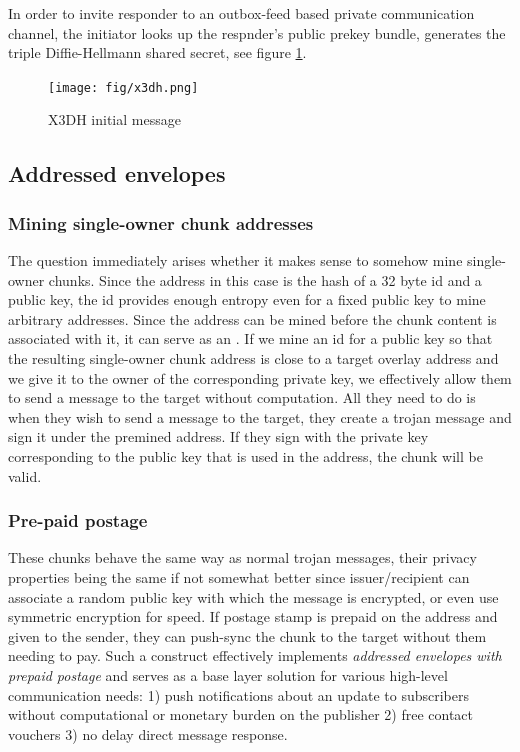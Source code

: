 In order to invite responder to an outbox-feed based private communication channel, the initiator looks up the respnder's public prekey bundle,  generates the triple Diffie-Hellmann shared secret, see figure \ref{fig:x3dh}.


\begin{figure}[htbp]
   \centering
   \texttt{[image: fig/x3dh.png]}
   \caption[X3DH initial message \statusorange]{X3DH initial message}
   \label{fig:x3dh}
\end{figure}


\subsection{Addressed envelopes\statusgreen}\label{sec:addressed-envelopes}

\subsubsection{Mining single-owner chunk addresses}
The question immediately arises whether it makes sense to somehow mine single-owner chunks. Since the address in this case is the hash of a 32 byte id and a public key, the id provides enough entropy even for a fixed public key to mine arbitrary addresses. Since the address can be mined before the chunk content is associated with it, it can serve as an . If we mine an id for a public key so that the resulting single-owner chunk address is close to a target overlay address and we give it to the owner of the corresponding private key, we effectively allow them to send a message to the target without computation. All they need to do is when they wish to send a message to the target, they create a trojan message and sign it under the premined address. If they sign with the private key corresponding to the public key that is used in the address, the chunk will be valid.

\subsubsection{Pre-paid postage}

These chunks behave the same way as normal trojan messages, their privacy properties being the same if not somewhat better since issuer/recipient can associate a random public key with which the message is encrypted, or even use symmetric encryption for speed. If postage stamp is prepaid on the address and given to the sender, they can push-sync the chunk to the target without them needing to pay. Such a construct effectively implements \emph{addressed envelopes with prepaid postage} and serves as a  base layer solution for various high-level communication needs: 1) push notifications about an update to subscribers without computational or monetary burden on the publisher 2) free contact vouchers 3) no delay direct message response.  

